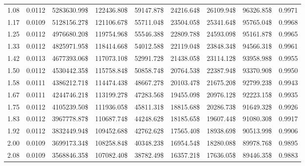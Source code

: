 \begin{tabular}{ccccccccc}
\num{1.08} & \num{0.0112} & \num{5283630.99}\$ & \num{122436.80}\$ & \num{59147.87}\$ & \num{24216.64}\$ & \num{26109.94}\$ &  \num{96326.85}\$ & \num{0.9971} \\
\num{1.17} & \num{0.0109} & \num{5128156.27}\$ & \num{121106.67}\$ & \num{55711.04}\$ & \num{23504.05}\$ & \num{25341.64}\$ &  \num{95765.04}\$ & \num{0.9968} \\
\num{1.25} & \num{0.0112} & \num{4976680.20}\$ & \num{119754.96}\$ & \num{55546.38}\$ & \num{22809.78}\$ & \num{24593.09}\$ &  \num{95161.87}\$ & \num{0.9965} \\
\num{1.33} & \num{0.0112} & \num{4825971.95}\$ & \num{118414.66}\$ & \num{54012.58}\$ & \num{22119.04}\$ & \num{23848.34}\$ &  \num{94566.31}\$ & \num{0.9961} \\
\num{1.42} & \num{0.0113} & \num{4677393.06}\$ & \num{117073.10}\$ & \num{52991.72}\$ & \num{21438.05}\$ & \num{23114.12}\$ &  \num{93958.98}\$ & \num{0.9955} \\
\num{1.50} & \num{0.0112} & \num{4530442.35}\$ & \num{115758.84}\$ & \num{50858.74}\$ & \num{20764.53}\$ & \num{22387.94}\$ &  \num{93370.90}\$ & \num{0.9950} \\
\num{1.58} & \num{0.0111} & \num{4386212.71}\$ & \num{114474.43}\$ & \num{48667.27}\$ & \num{20103.47}\$ & \num{21675.20}\$ &  \num{92799.23}\$ & \num{0.9943} \\
\num{1.67} & \num{0.0111} & \num{4244746.21}\$ & \num{113199.27}\$ & \num{47283.56}\$ & \num{19455.09}\$ & \num{20976.12}\$ &  \num{92223.15}\$ & \num{0.9935} \\
\num{1.75} & \num{0.0112} & \num{4105239.50}\$ & \num{111936.05}\$ & \num{45811.31}\$ & \num{18815.68}\$ & \num{20286.73}\$ &  \num{91649.32}\$ & \num{0.9926} \\
\num{1.83} & \num{0.0112} & \num{3967778.87}\$ & \num{110687.74}\$ & \num{44248.62}\$ & \num{18185.65}\$ & \num{19607.44}\$ &  \num{91080.30}\$ & \num{0.9917} \\
\num{1.92} & \num{0.0112} & \num{3832449.94}\$ & \num{109452.68}\$ & \num{42762.62}\$ & \num{17565.40}\$ & \num{18938.69}\$ &  \num{90513.99}\$ & \num{0.9906} \\
\num{2.00} & \num{0.0109} & \num{3699173.34}\$ & \num{108258.84}\$ & \num{40348.23}\$ & \num{16954.54}\$ & \num{18280.08}\$ &  \num{89978.76}\$ & \num{0.9895} \\
\num{2.08} & \num{0.0109} & \num{3568846.35}\$ & \num{107082.40}\$ & \num{38782.49}\$ & \num{16357.21}\$ & \num{17636.05}\$ &  \num{89446.35}\$ & \num{0.9883} \\

\end{tabular}
